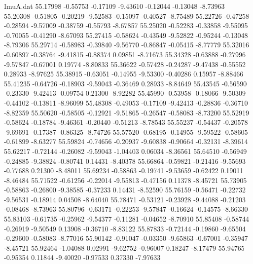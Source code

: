 \begin{filecontents}{ImuA.dat}
  55.17998   -0.55753   -0.17109   -9.43610   -0.12044   -0.13048   -8.73963
  55.20308   -0.51805   -0.20219   -9.52583   -0.15097   -0.40527   -8.75489
  55.22726   -0.47258   -0.28594   -9.57009   -0.38759   -0.55793   -8.67857
  55.25020   -0.52283   -0.33858   -9.55095   -0.70055   -0.41290   -8.67093
  55.27415   -0.58624   -0.43549   -9.52822   -0.95244   -0.13048   -8.79306
  55.29714   -0.58983   -0.39840   -9.56770   -0.86847   -0.05415   -8.77779
  55.32016   -0.60897   -0.38764   -9.41815   -0.88374    0.09851   -8.71673
  55.34328   -0.63888   -0.27996   -9.57847   -0.67001    0.19774   -8.80833
  55.36622   -0.57428   -0.24287   -9.47438   -0.55552    0.28933   -8.97625
  55.38915   -0.63051   -0.14955   -9.53300   -0.40286    0.15957   -8.88466
  55.41235   -0.64726   -0.18903   -9.59043   -0.36469    0.28933   -8.84649
  55.43545   -0.56590   -0.23330   -9.42413   -0.09754    0.21300   -8.92282
  55.45990   -0.53958   -0.18066   -9.50309   -0.44102   -0.13811   -8.96099
  55.48308   -0.49053   -0.17109   -9.42413   -0.28836   -0.36710   -8.82359
  55.50620   -0.58505   -0.12921   -9.51865   -0.26547   -0.58083   -8.73200
  55.52919   -0.58624   -0.18784   -9.46361   -0.20440   -0.51213   -8.78543
  55.55237   -0.54437   -0.20578   -9.69691   -0.17387   -0.86325   -8.74726
  55.57520   -0.68195   -0.14955   -9.59522   -0.58605   -0.61899   -8.63277
  55.59824   -0.74656   -0.20937   -9.60838   -0.90664   -0.32131   -8.39614
  55.62217   -0.72144   -0.26082   -9.59043   -1.04403    0.06034   -8.36561
  55.64510   -0.56949   -0.24885   -9.38824   -0.80741    0.14431   -8.40378
  55.66864   -0.59821   -0.21416   -9.55693   -0.77688    0.21300   -8.48011
  55.69234   -0.58863   -0.19741   -9.53659   -0.62422    0.19011   -8.46484
  55.71522   -0.61256   -0.22014   -9.55813   -0.47156    0.11378   -8.45721
  55.73905   -0.58863   -0.26800   -9.38585   -0.37233    0.14431   -8.52590
  55.76159   -0.56471   -0.22732   -9.56531   -0.18914    0.04508   -8.64040
  55.78471   -0.53121   -0.23928   -9.44088   -0.21203   -0.08468   -8.73963
  55.80796   -0.63171   -0.22253   -9.57847   -0.16624   -0.14575   -8.66330
  55.83103   -0.61735   -0.25962   -9.54377   -0.11281   -0.04652   -8.70910
  55.85408   -0.58744   -0.26919   -9.50549    0.13908   -0.36710   -8.83122
  55.87833   -0.72144   -0.19860   -9.65504   -0.29600   -0.58083   -8.77016
  55.90142   -0.91047   -0.03350   -9.65863   -0.67001   -0.35947   -8.45721
  55.92464   -1.04088    0.02991   -9.62752   -0.96007    0.18247   -8.17479
  55.94765   -0.95354    0.11844   -9.40020   -0.97533    0.37330   -7.97633

\end{filecontents}

